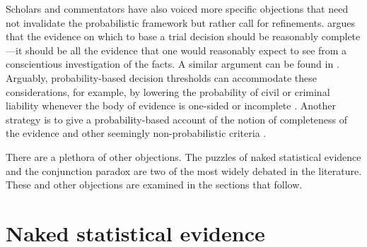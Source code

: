 \documentclass{article}
\begin{document}
Scholars and commentators have also voiced more specific objections that need not invalidate the probabilistic framework but rather call for  refinements.  \cite{nance2016} argues that the evidence on which to base a trial decision should be reasonably complete---it should be all the evidence that one would reasonably expect to see from a conscientious investigation of the facts. A similar argument can be found in \citep{davidsonpargetter1987}. Arguably, probability-based decision thresholds can accommodate these considerations, for example, by lowering the probability of civil or criminal liability whenever the body of evidence is one-sided or incomplete  \citep{Kaye79gate, Kaye1986Do, friedman1996}. Another strategy is to give a probability-based account of the notion of completeness of the evidence and other seemingly non-probabilistic criteria   \citep{Urbaniak2017Narration-in-ju}.

There are a plethora of other objections. The puzzles of naked statistical evidence and the conjunction paradox are two of the most widely debated in the literature. These and other objections are examined in the sections that follow.

\section{Naked statistical evidence}\label{sec:naked}

\end{document}
